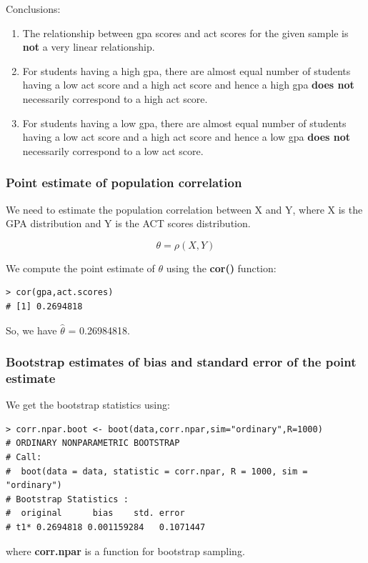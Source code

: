 \documentclass[12pt,letterpaper,titlepage,en-US]{article}
\begin{document}
Conclusions:
\begin{enumerate}
\item The relationship between gpa scores and act scores for the given sample is \textbf{not} a very linear relationship.
\item For students having a high gpa, there are almost equal number of students having a low act score and a high act score
and hence a high gpa \textbf{does not} necessarily correspond to a high act score.
\item For students having a low gpa, there are almost equal number of students having a low act score and a high act score and hence a low gpa \textbf{does not} necessarily correspond to a low act score.
\end{enumerate}

\subsubsection{Point estimate of population correlation}
We need to estimate the population correlation between X and Y, where X is the GPA distribution and Y is the ACT scores distribution.

\begin{equation}
\theta = \rho (X,Y)
\end{equation}


We compute the point estimate of $\theta$ using the \textbf{cor()} function:
\begin{knitrout}
\color{fgcolor}
\begin{kframe}
\begin{verbatim}
> cor(gpa,act.scores)
# [1] 0.2694818 
\end{verbatim}
\end{kframe}
\end{knitrout}

So, we have $\hat{\theta}$ = 0.26984818.



\subsubsection{Bootstrap estimates of bias and standard error of the point estimate}
We get the bootstrap statistics using:
\begin{knitrout}
\color{fgcolor}
\begin{kframe}
\begin{verbatim}
> corr.npar.boot <- boot(data,corr.npar,sim="ordinary",R=1000)
# ORDINARY NONPARAMETRIC BOOTSTRAP
# Call:
#  boot(data = data, statistic = corr.npar, R = 1000, sim = "ordinary")
# Bootstrap Statistics :
#  original      bias    std. error
# t1* 0.2694818 0.001159284   0.1071447
\end{verbatim}
\end{kframe}
\end{knitrout}
where \textbf{corr.npar} is a function for bootstrap sampling.\\
\end{document}
